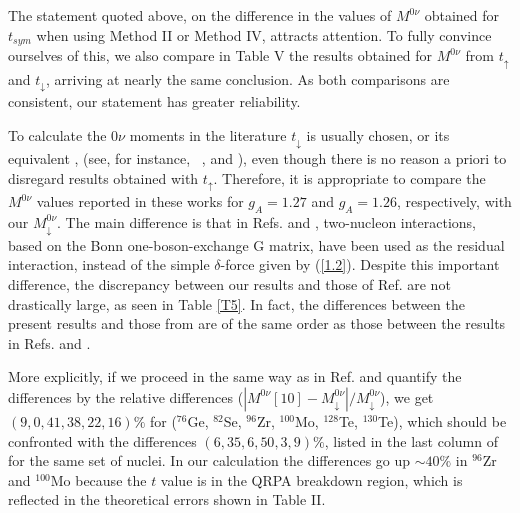 \documentclass[nofootinbib,twocolumn,eqsecnum,floats,aps]{revtex4}
\def\sss{\scriptscriptstyle}
\def\rf#1{{(\ref{#1})}}
\def\sss{\scriptscriptstyle}
\begin{document}
{%
The statement quoted above, on the difference in the values of $M^{0\nu}$ obtained
for $t_{sym}$ when  using Method II or Method IV, attracts attention.
To fully convince ourselves of this, we also compare in Table V the results
obtained  for $M^{0\nu}$
from $t_\uparrow$ and $t_\downarrow$, arriving at nearly the same conclusion.
As both comparisons are consistent, our statement  has greater reliability.


To calculate the $0\nu$ moments in the literature $t_\downarrow$ is usually chosen, or its equivalent \cite{Sim13,Hyv15},   (see, for instance,~ \cite[Fig. 1]{Rod03}, and \cite[Fig. 6]
{Eng16}), even though there is no reason a priori to disregard results obtained with  $t_\uparrow$.
Therefore, it is appropriate to compare the $M^{0\nu}$ values reported in these works for $ g_{\sss A} = 1.27$ and  $ g_{\sss A} = 1.26$, respectively, with our $M^{0\nu}_\downarrow$.
The main difference is that   in  Refs. \cite{Sim13} and \cite{Hyv15}, two-nucleon interactions, based on the Bonn one-boson-exchange G matrix,  have been used as the residual  interaction, instead of the simple $\delta$-force given by \rf{1.2}.
Despite this important difference, the discrepancy between our results and those of Ref. \cite{Hyv15}
are not drastically large, as seen in Table \ref{T5}. In fact, the  differences between the present results and those from \cite[Table III]{Hyv15}
are of the same order as those between the results in Refs.
 \cite{Sim13}  and \cite{Hyv15}.

More explicitly, if we proceed in the same way as in Ref. \cite{Hyv15} and quantify the differences by the relative differences
 ($|M^{0\nu}[10]-M^{0\nu}_\downarrow|/M^{0\nu}_\downarrow$),
we get $(9, 0, 41, 38, 22, 16)\%$  for ($^{76}$Ge, $^{82}$Se, $^{96}$Zr, $^{100}$Mo, $^{128}$Te, $^{130}$Te), which should be confronted with the differences $( 6,        35,       6,          50,                3,        9)\%$, listed in the last column of
\cite[Table III]{Hyv15} for the same set of nuclei.
In our calculation the  differences
  go up $\sim 40\%$ in $^{96}$Zr and $^{100}$Mo because  the  $t$ value is in the QRPA breakdown region, which is reflected in the theoretical errors shown in Table II.

}
\end{document}
